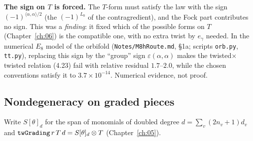 \begin{warning}
\textbf{The sign on $T$ is forced.} The $T$-form must satisfy the law with the sign
$(-1)^{\langle\alpha,\alpha\rangle/2}$ (the $(-1)^{L_0}$ of the contragredient), and the Fock
part contributes no sign. This was a \emph{finding}: it fixed which of the possible forms on $T$
(Chapter~\ref{ch:06}) is the compatible one, with no extra twist by $e_\gamma$ needed. In the
numerical $E_8$ model of the orbifold (\texttt{Notes/M8hRoute.md}, \S1a; scripts \texttt{orb.py},
\texttt{tt.py}), replacing this sign by the ``group'' sign $\varepsilon(\alpha,\alpha)$ makes the
twisted$\times$twisted relation (4.23) fail with relative residual $1.7$--$2.0$, while the chosen
conventions satisfy it to $3.7\times10^{-14}$. Numerical evidence, not proof.
\end{warning}

\subsection{Nondegeneracy on graded pieces}

Write $S[\theta]_d$ for the span of monomials of doubled degree $d=\sum_v(2n_v+1)d_v$ and
$\lean{twGrading}\,r\,T\,d=S[\theta]_d\otimes T$ (Chapter~\ref{ch:05}).

